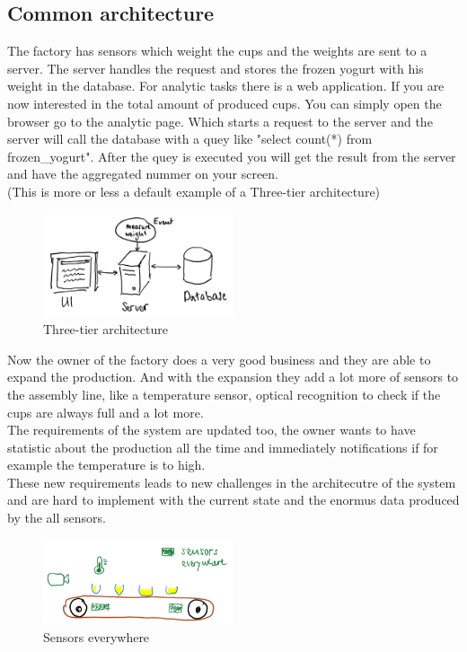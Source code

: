 \subsection{Common architecture}
The factory has sensors which weight the cups and the weights are sent to a server.
The server handles the request and stores the frozen yogurt with his weight in the database.
For analytic tasks there is a web application. If you are now interested in the total amount of produced cups.
You can simply open the browser go to the analytic page.
Which starts a request to the server and the server will call the database with a quey like "select count(*) from frozen\_yogurt".
After the quey is executed you will get the result from the server and have the aggregated nummer on your screen.\\
(This is more or less a default example of a Three-tier architecture)

\begin{figure}[H]
\centering
\captionsetup{justification=centering}
\includegraphics[width=0.5\textwidth]{images/three_tier.png}
\caption[Three-tier architecture]{Three-tier architecture}
\end{figure}

\newpage

Now the owner of the factory does a very good business and they are able to expand the production.
And with the expansion they add a lot more of sensors to the assembly line, like a temperature sensor,
optical recognition to check if the cups are always full and a lot more.\\
The requirements of the system are updated too, the owner wants to have statistic about the production all the time
and immediately notifications if for example the temperature is to high.\\
These new requirements leads to new challenges in the architecutre of the system and are hard to implement with the
current state and the enormus data produced by the all sensors.

\begin{figure}[H]
\centering
\captionsetup{justification=centering}
\includegraphics[width=0.5\textwidth]{images/sensors.png}
\caption[Sensors everywhere]{Sensors everywhere}
\end{figure}


